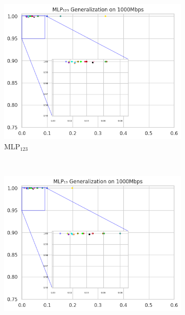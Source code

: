 \documentclass[a4paper,fleqn]{cas-sc}
\begin{document}
\begin{figure}[h!]
\begin{minipage}[t]{0.46\textwidth}
\end{minipage}
\hfill%
\begin{minipage}[t]{0.46\textwidth} %
		\vspace{0.5cm}
		\begin{subfigure}[t]{0.33\textwidth}
			\includegraphics[draft=false, width=\textwidth]{./figs/Generalizacao-MLP123-1000Mbps.png} 
			\caption{MLP$_{123}$}
			\label{fig:Generalizacao-MLP123-1000Mbps}
		\end{subfigure}%
		~
		\begin{subfigure}[t]{0.33\textwidth}
			\includegraphics[draft=false, width=\textwidth]{./figs/Generalizacao-MLP13-1000Mbps.png} 

\end{subfigure}
\end{minipage}
\end{figure}
\end{document}
